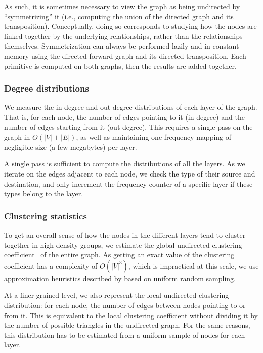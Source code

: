 As such, it is sometimes necessary to view the graph as being undirected by
``symmetrizing'' it (i.e., computing the union of the directed graph and its
transposition). Conceptually, doing so corresponds to studying how the nodes
are linked together by the underlying relationships, rather than the
relationships themselves.
Symmetrization can always be performed lazily and in constant memory using the
directed forward graph and its directed transposition. Each primitive is
computed on both graphs, then the results are added together.

\subsubsection{Degree distributions}
We measure the in-degree and out-degree distributions of each layer of the graph.
That is, for each node, the number of edges pointing to it (in-degree) and the
number of edges starting from it (out-degree).
This requires a single pass on the graph in $O(|V|+|E|)$, as well as
maintaining one frequency mapping of negligible size (a few megabytes) per
layer.

A single pass is sufficient to compute the distributions of all the layers. As
we iterate on the edges adjacent to each node, we check the type of their
source and destination, and only increment the frequency counter of a specific
layer if these types belong to the layer.

\subsubsection{Clustering statistics}
To get an overall sense of how the nodes in the different layers tend to
cluster together in high-density groups, we estimate the global undirected
clustering coefficient~\cite{watts1998collective} of the entire graph. As
getting an exact value of the clustering coefficient has a complexity of
$O(|V|^3)$, which is impractical at this scale, we use approximation
heuristics described by \textcite{schank2005approximating} based on uniform
random sampling.

At a finer-grained level, we also represent the local undirected clustering
distribution: for each node, the number of edges between nodes pointing to or
from it. This is equivalent to the local clustering coefficient without
dividing it by the number of possible triangles in the undirected graph.
For the same reasons, this distribution has to be estimated from a uniform
sample of nodes for each layer.

